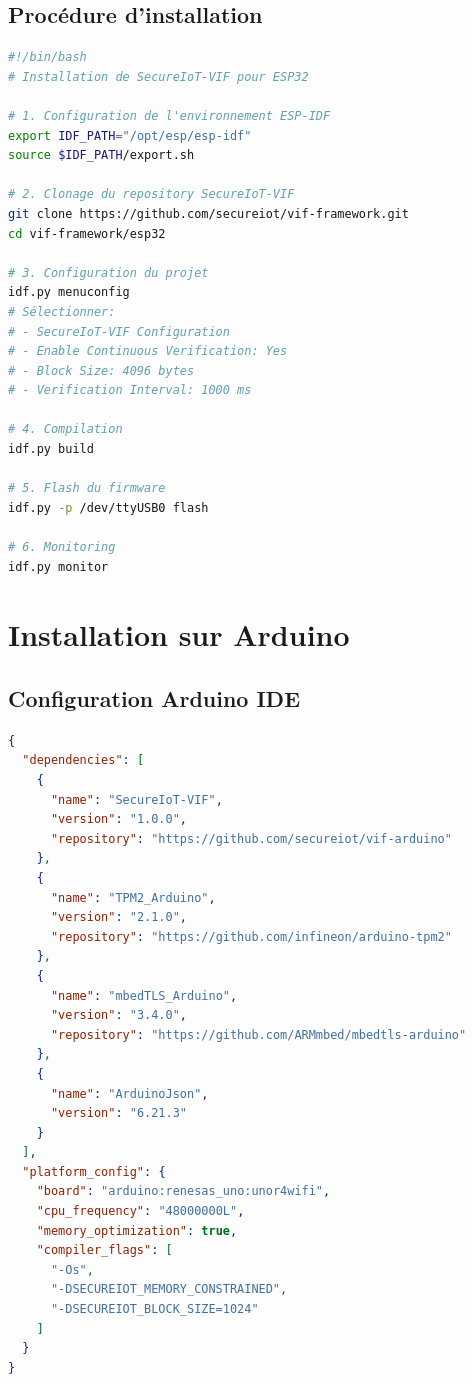 \subsection{Procédure d'installation}

\begin{lstlisting}[language=bash, caption={Script d'installation pour ESP32}]
#!/bin/bash
# Installation de SecureIoT-VIF pour ESP32

# 1. Configuration de l'environnement ESP-IDF
export IDF_PATH="/opt/esp/esp-idf"
source $IDF_PATH/export.sh

# 2. Clonage du repository SecureIoT-VIF
git clone https://github.com/secureiot/vif-framework.git
cd vif-framework/esp32

# 3. Configuration du projet
idf.py menuconfig
# Sélectionner:
# - SecureIoT-VIF Configuration
# - Enable Continuous Verification: Yes
# - Block Size: 4096 bytes
# - Verification Interval: 1000 ms

# 4. Compilation
idf.py build

# 5. Flash du firmware
idf.py -p /dev/ttyUSB0 flash

# 6. Monitoring
idf.py monitor
\end{lstlisting}

\section{Installation sur Arduino}

\subsection{Configuration Arduino IDE}

\begin{lstlisting}[language=json, caption={Configuration libraries.json pour Arduino}]
{
  "dependencies": [
    {
      "name": "SecureIoT-VIF",
      "version": "1.0.0",
      "repository": "https://github.com/secureiot/vif-arduino"
    },
    {
      "name": "TPM2_Arduino",
      "version": "2.1.0",
      "repository": "https://github.com/infineon/arduino-tpm2"
    },
    {
      "name": "mbedTLS_Arduino",
      "version": "3.4.0",
      "repository": "https://github.com/ARMmbed/mbedtls-arduino"
    },
    {
      "name": "ArduinoJson",
      "version": "6.21.3"
    }
  ],
  "platform_config": {
    "board": "arduino:renesas_uno:unor4wifi",
    "cpu_frequency": "48000000L",
    "memory_optimization": true,
    "compiler_flags": [
      "-Os",
      "-DSECUREIOT_MEMORY_CONSTRAINED",
      "-DSECUREIOT_BLOCK_SIZE=1024"
    ]
  }
}
\end{lstlisting}

